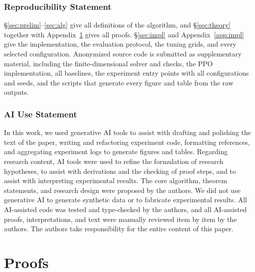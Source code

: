 \documentclass{article} %
\theoremstyle{plain}
\theoremstyle{remark}
\begin{document}
\label{main-end}

\subsubsection*{Reproducibility Statement}
\S\ref{sec:prelim}--\ref{sec:alg} give all definitions of the algorithm, and \S\ref{sec:theory} together with Appendix~\ref{app:proofs} gives all proofs. \S\ref{sec:impl} and Appendix~\ref{app:impl} give the implementation, the evaluation protocol, the tuning grids, and every selected configuration. Anonymized source code is submitted as supplementary material, including the finite-dimensional solver and checks, the PPO implementation, all baselines, the experiment entry points with all configurations and seeds, and the scripts that generate every figure and table from the raw outputs.

\subsubsection*{AI Use Statement}
In this work, we used generative AI tools to assist with drafting and polishing the text of the paper, writing and refactoring experiment code, formatting references, and aggregating experiment logs to generate figures and tables. Regarding research content, AI tools were used to refine the formulation of research hypotheses, to assist with derivations and the checking of proof steps, and to assist with interpreting experimental results. The core algorithm, theorem statements, and research design were proposed by the authors. We did not use generative AI to generate synthetic data or to fabricate experimental results. All AI-assisted code was tested and type-checked by the authors, and all AI-assisted proofs, interpretations, and text were manually reviewed item by item by the authors. The authors take responsibility for the entire content of this paper.




\appendix
\section{Proofs}
\label{app:proofs}
\end{document}
